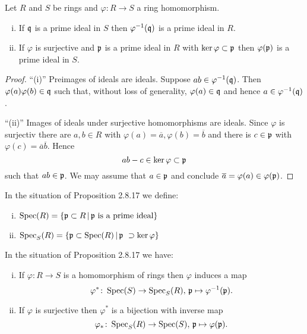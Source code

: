 

\begin{Prop}
Let $R$ and $S$ be rings and $\varphi\colon R \to S$ a ring homomorphism.
\begin{enumerate}[(i)]
\item If $\mathfrak{q}$ is a prime ideal in $S$ then $\varphi^{-1}(\mathfrak{q})$ is a prime ideal in $R$.
\item If $\varphi$ is surjective and $\mathfrak{p}$ is a prime ideal in $R$ with $\ker \varphi \subset \mathfrak{p}$ then $\varphi(\mathfrak{p})$ is a prime ideal in $S$.
\end{enumerate}
\end{Prop}


\begin{proof}
\enquote{(i)} Preimages of ideals are ideals. Suppose $ab \in \varphi^{-1}(\mathfrak{q})$. Then $\varphi(a)\varphi(b)  \in\mathfrak{q}$ such that, without loss of generality, $\varphi(a) \in \mathfrak{q}$
and hence $a \in \varphi^{-1}(\mathfrak{q})$.

\bigskip
\enquote{(ii)} Images of ideals under surjective homomorphisms are ideals. Since $\varphi$ is surjectiv there are $a,b \in R$ with $\varphi(a) = \overline{a}, \varphi(b)= \overline{b}$ and there is $c \in \mathfrak{p}$ with $\varphi(c) = \overline{a}\overline{b}$. Hence
\[ ab - c \in \ker \varphi \subset \mathfrak{p}
\]
such that $ab \in \mathfrak{p}$. We may assume that $a \in \mathfrak{p}$ and conclude $\overline{a} = \varphi(a) \in \varphi(\mathfrak{p})$.
\end{proof}


\begin{defi}
In the situation of Proposition 2.8.17 we define:
\begin{enumerate}[(i)]
\item $\operatorname{Spec}(R) = \left\{\mathfrak{p} \subset R \, | \, \mathfrak{p} \text{ is a prime ideal}\right\}$
\item $\operatorname{Spec}_S(R) = \left\{\mathfrak{p} \subset \operatorname{Spec}(R) \, | \, \mathfrak{p} \ \supset \ker \varphi\right\}$
\end{enumerate}
\end{defi}


\begin{Kor}
In the situation of Proposition 2.8.17 we have:
\begin{enumerate}[(i)]
\item If $\varphi \colon R \to S$ is a homomorphism of rings then $\varphi$ induces a map
\[ \varphi^* \colon \operatorname{Spec}(S) \to \operatorname{Spec}_S(R), \, \mathfrak{p} \mapsto \varphi^{-1}(\mathfrak{p}).
\]
\item If $\varphi$ is surjective then $\varphi^*$ is a bijection with inverse map
\[ \varphi_* \colon \operatorname{Spec}_S(R) \to \operatorname{Spec}(S), \, \mathfrak{p} \mapsto \varphi(\mathfrak{p}).
\]
\end{enumerate}
\end{Kor}

